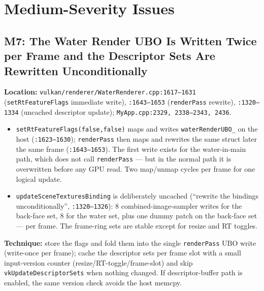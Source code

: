 \documentclass[11pt,a4paper]{article}
\begin{document}
\section{Medium-Severity Issues}

\subsection{M7: The Water Render UBO Is Written Twice per Frame and the Descriptor Sets Are Rewritten Unconditionally}

\textbf{Location:} \texttt{vulkan/renderer/WaterRenderer.cpp:1617--1631} (\texttt{setRtFeatureFlags} immediate write), \texttt{:1643--1653} (\texttt{renderPass} rewrite),
\texttt{:1320--1334} (uncached descriptor update); \texttt{MyApp.cpp:2329, 2338--2343, 2436}.

\begin{itemize}
    \item \texttt{setRtFeatureFlags(false,false)} maps and writes \texttt{waterRenderUBO\_} on the host (\texttt{:1623--1630}); \texttt{renderPass} then maps and rewrites the
    same struct later the same frame (\texttt{:1643--1653}). The first write exists for the water-in-main path, which does not call \texttt{renderPass} --- but in the normal
    path it is overwritten before any GPU read. Two map/unmap cycles per frame for one logical update.
    \item \texttt{updateSceneTexturesBinding} is deliberately uncached (``rewrite the bindings unconditionally'', \texttt{:1320--1326}): 8 combined-image-sampler writes for the
    back-face set, 8 for the water set, plus one dummy patch on the back-face set --- per frame. The frame-ring sets are stable except for resize and RT toggles.
\end{itemize}

\textbf{Technique:} store the flags and fold them into the single \texttt{renderPass} UBO write (write-once per frame); cache the descriptor sets per frame slot with a small
input-version counter (resize/RT-toggle/frame-slot) and skip \texttt{vkUpdateDescriptorSets} when nothing changed. If descriptor-buffer path is enabled, the same version check
avoids the host memcpy.
\end{document}
